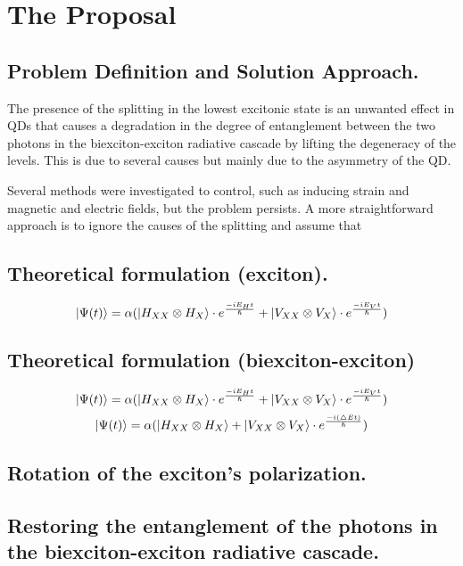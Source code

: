 \section{The Proposal}
\subsection{Problem Definition and Solution Approach.}
The presence of the splitting in the lowest excitonic state is an unwanted effect in QDs that causes a degradation in the degree of entanglement between the two photons in the biexciton-exciton radiative cascade by lifting the degeneracy of the levels\cite{Winik2017}. This is due to several causes but mainly due to the asymmetry of the QD.

Several methods were investigated to control, such as inducing strain and magnetic and electric fields, but the problem persists. A more straightforward approach is to ignore the causes of the splitting and assume that 
\subsection{Theoretical formulation (exciton).}
\begin{equation}
	\ket{\Psi(t)} = \alpha(\ket{H_{XX} \otimes  H_X}\cdot e^{\frac{-iE_H t}{\hslash}}+\ket{V_{XX}\otimes V_X}\cdot e^{\frac{-iE_Vt}{\hslash}})
\end{equation}
\subsection{Theoretical formulation (biexciton-exciton)}
	\begin{equation}
	\ket{\Psi(t)} = \alpha(\ket{H_{XX} \otimes  H_X}\cdot e^{\frac{-iE_H t}{\hslash}}+\ket{V_{XX}\otimes V_X}\cdot e^{\frac{-iE_Vt}{\hslash}})
	\end{equation}
\begin{equation}
	\ket{\Psi(t)} = \alpha(\ket{H_{XX} \otimes H_X}+\ket{V_{XX}\otimes V_X}\cdot e^{\frac{-i(\triangle Et)}{\hslash}})
\end{equation}
\subsection{Rotation of the exciton's polarization.}
\subsection{Restoring the entanglement of the photons in the biexciton-exciton radiative cascade.}

